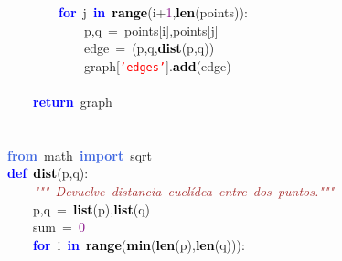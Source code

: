 \mbox{}\ \ \ \ \ \ \ \ \textbf{\textcolor{Blue}{for}}\ j\ \textbf{\textcolor{Blue}{in}}\ \textbf{\textcolor{Black}{range}}\textcolor{BrickRed}{(}i\textcolor{BrickRed}{+}\textcolor{Purple}{1}\textcolor{BrickRed}{,}\textbf{\textcolor{Black}{len}}\textcolor{BrickRed}{(}points\textcolor{BrickRed}{)):} \\
\mbox{}\ \ \ \ \ \ \ \ \ \ \ \ p\textcolor{BrickRed}{,}q\ \textcolor{BrickRed}{=}\ points\textcolor{BrickRed}{[}i\textcolor{BrickRed}{],}points\textcolor{BrickRed}{[}j\textcolor{BrickRed}{]} \\
\mbox{}\ \ \ \ \ \ \ \ \ \ \ \ edge\ \textcolor{BrickRed}{=}\ \textcolor{BrickRed}{(}p\textcolor{BrickRed}{,}q\textcolor{BrickRed}{,}\textbf{\textcolor{Black}{dist}}\textcolor{BrickRed}{(}p\textcolor{BrickRed}{,}q\textcolor{BrickRed}{))} \\
\mbox{}\ \ \ \ \ \ \ \ \ \ \ \ graph\textcolor{BrickRed}{[}\texttt{\textcolor{Red}{'edges'}}\textcolor{BrickRed}{].}\textbf{\textcolor{Black}{add}}\textcolor{BrickRed}{(}edge\textcolor{BrickRed}{)} \\
\mbox{}\ \ \ \ \ \ \ \ \ \ \ \  \\
\mbox{}\ \ \ \ \textbf{\textcolor{Blue}{return}}\ graph \\
\mbox{} \\
\mbox{} \\
\mbox{}\textbf{\textcolor{RoyalBlue}{from}}\ math\ \textbf{\textcolor{RoyalBlue}{import}}\ sqrt \\
\mbox{}\textbf{\textcolor{Blue}{def}}\ \textbf{\textcolor{Black}{dist}}\textcolor{BrickRed}{(}p\textcolor{BrickRed}{,}q\textcolor{BrickRed}{):} \\
\mbox{}\textit{\textcolor{Brown}{\ \ \ \ "{}"{}"{}\ Devuelve\ distancia\ euclídea\ entre\ dos\ puntos."{}"{}"{}}} \\
\mbox{}\ \ \ \ p\textcolor{BrickRed}{,}q\ \textcolor{BrickRed}{=}\ \textbf{\textcolor{Black}{list}}\textcolor{BrickRed}{(}p\textcolor{BrickRed}{),}\textbf{\textcolor{Black}{list}}\textcolor{BrickRed}{(}q\textcolor{BrickRed}{)} \\
\mbox{}\ \ \ \ sum\ \textcolor{BrickRed}{=}\ \textcolor{Purple}{0} \\
\mbox{}\ \ \ \ \textbf{\textcolor{Blue}{for}}\ i\ \textbf{\textcolor{Blue}{in}}\ \textbf{\textcolor{Black}{range}}\textcolor{BrickRed}{(}\textbf{\textcolor{Black}{min}}\textcolor{BrickRed}{(}\textbf{\textcolor{Black}{len}}\textcolor{BrickRed}{(}p\textcolor{BrickRed}{),}\textbf{\textcolor{Black}{len}}\textcolor{BrickRed}{(}q\textcolor{BrickRed}{))):} \\
